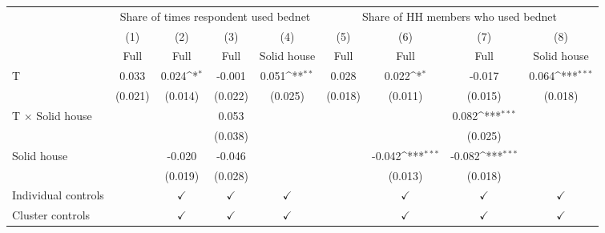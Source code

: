 {
\def\sym#1{\ifmmode^{#1}\else\(^{#1}\)\fi}
\begin{tabular}{l*{8}{c}}
\hline\hline
                &\multicolumn{4}{c}{Share of times respondent used bednet}                  &\multicolumn{4}{c}{Share of HH members who used bednet}                    \\\cmidrule(lr){2-5}\cmidrule(lr){6-9}
                &\multicolumn{1}{c}{(1)}         &\multicolumn{1}{c}{(2)}         &\multicolumn{1}{c}{(3)}         &\multicolumn{1}{c}{(4)}         &\multicolumn{1}{c}{(5)}         &\multicolumn{1}{c}{(6)}         &\multicolumn{1}{c}{(7)}         &\multicolumn{1}{c}{(8)}         \\
                &     Full         &     Full         &     Full         &Solid house         &     Full         &     Full         &     Full         &Solid house         \\
\hline
T               &    0.033         &    0.024\sym{*}  &   -0.001         &    0.051\sym{**} &    0.028         &    0.022\sym{*}  &   -0.017         &    0.064\sym{***}\\
                &  (0.021)         &  (0.014)         &  (0.022)         &  (0.025)         &  (0.018)         &  (0.011)         &  (0.015)         &  (0.018)         \\
T $\times$ Solid house&                  &                  &    0.053         &                  &                  &                  &    0.082\sym{***}&                  \\
                &                  &                  &  (0.038)         &                  &                  &                  &  (0.025)         &                  \\
Solid house     &                  &   -0.020         &   -0.046         &                  &                  &   -0.042\sym{***}&   -0.082\sym{***}&                  \\
                &                  &  (0.019)         &  (0.028)         &                  &                  &  (0.013)         &  (0.018)         &                  \\
Individual controls&                  &$\checkmark$         &$\checkmark$         &$\checkmark$         &                  &$\checkmark$         &$\checkmark$         &$\checkmark$         \\
Cluster controls&                  &$\checkmark$         &$\checkmark$         &$\checkmark$         &                  &$\checkmark$         &$\checkmark$         &$\checkmark$         \\

\end{tabular}}

